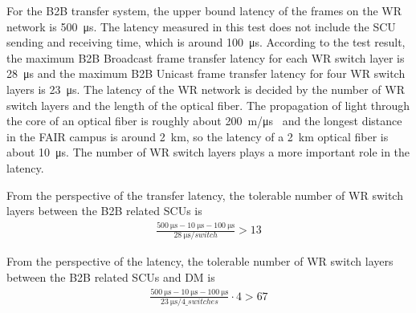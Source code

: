 
For the B2B transfer system, the upper bound latency of the frames on the WR network is \SI{500}{\us}. The latency measured in this test does not include the SCU sending and receiving time, which is around \SI{100}{\us}. According to the test result, the maximum B2B Broadcast frame transfer latency for each WR switch layer is \SI{28}{\micro\second} and the maximum B2B Unicast frame transfer latency for four WR switch layers is  \SI{23}{\micro\second}. The latency of the WR network is decided by the number of WR switch layers and the length of the optical fiber. The propagation of light through the core of an optical fiber is roughly about \SI{200}{\meter/\us}~\cite{noauthor_calculating_2012} and the longest distance in the FAIR campus is around \SI{2}{\kilo\meter}, so the latency of a \SI{2}{\kilo\meter} optical fiber is about \SI{10}{\us}. The number of WR switch layers plays a more important role in the latency. 

From the perspective of the transfer latency, the tolerable number of WR switch layers between the B2B related \gls{SCU}s is 
		\begin{equation}
		\begin{aligned}
			\frac{\SI{500}{\us}-\SI{10}{\us}-\SI{100}{\us}}{\SI{28}{\us/switch}}>13
		\label {num_switch_b}
		\end{aligned}
		\end{equation}

From the perspective of the latency, the tolerable number of WR switch layers between the B2B related \gls{SCU}s and DM is
		\begin{equation}
		\begin{aligned}
			\frac{\SI{500}{\us}-\SI{10}{\us}-\SI{100}{\us}}{\SI{23}{\us/4\_switches}}\cdot 4 > 67
		\label {num_switch_b}
		\end{aligned}
		\end{equation}

